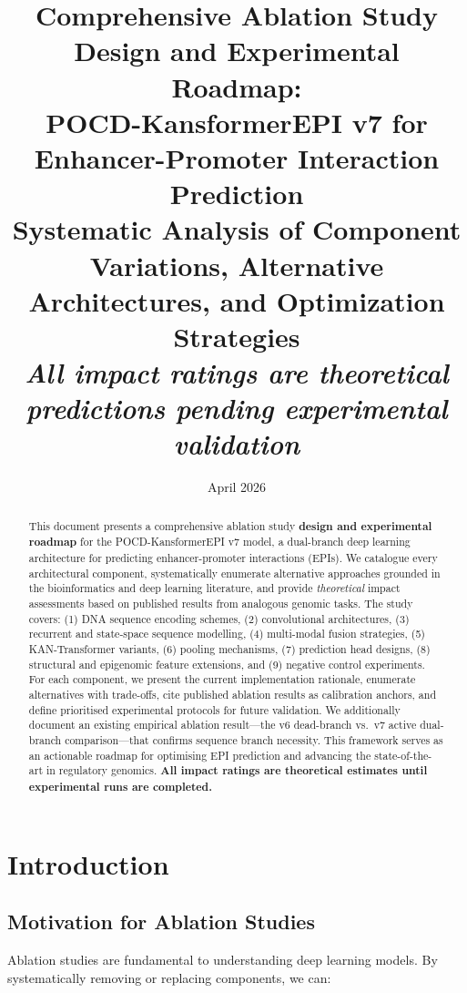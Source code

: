 \documentclass[11pt,a4paper]{article}
\title{\textbf{Comprehensive Ablation Study Design and Experimental Roadmap:\\POCD-KansformerEPI v7 for Enhancer-Promoter Interaction Prediction}\\[0.5cm]
\large Systematic Analysis of Component Variations, Alternative Architectures, and Optimization Strategies\\[0.2cm]
\normalsize\textit{All impact ratings are theoretical predictions pending experimental validation}}
\date{April 2026}
\begin{document}
\maketitle

\begin{abstract}
This document presents a comprehensive ablation study \textbf{design and experimental roadmap} for the POCD-KansformerEPI v7 model, a dual-branch deep learning architecture for predicting enhancer-promoter interactions (EPIs). We catalogue every architectural component, systematically enumerate alternative approaches grounded in the bioinformatics and deep learning literature, and provide \textit{theoretical} impact assessments based on published results from analogous genomic tasks. The study covers: (1) DNA sequence encoding schemes, (2) convolutional architectures, (3) recurrent and state-space sequence modelling, (4) multi-modal fusion strategies, (5) KAN-Transformer variants, (6) pooling mechanisms, (7) prediction head designs, (8) structural and epigenomic feature extensions, and (9) negative control experiments. For each component, we present the current implementation rationale, enumerate alternatives with trade-offs, cite published ablation results as calibration anchors, and define prioritised experimental protocols for future validation. We additionally document an existing empirical ablation result---the v6 dead-branch vs.\ v7 active dual-branch comparison---that confirms sequence branch necessity. This framework serves as an actionable roadmap for optimising EPI prediction and advancing the state-of-the-art in regulatory genomics. \textbf{All impact ratings are theoretical estimates until experimental runs are completed.}
\end{abstract}

\tableofcontents
\newpage

\section{Introduction}

\subsection{Motivation for Ablation Studies}

Ablation studies are fundamental to understanding deep learning models. By systematically removing or replacing components, we can:
\end{document}

